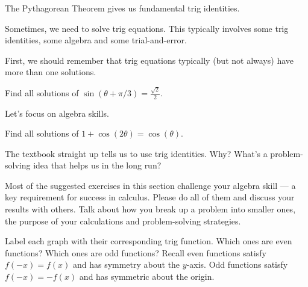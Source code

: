 \documentclass[../main.tex]{subfiles}
\begin{document}
The Pythagorean Theorem gives us fundamental trig identities.


Sometimes, we need to solve trig equations. This typically involves some trig identities, some algebra and some trial-and-error. 

First, we should remember that trig equations typically (but not always) have more than one solutions. 
\begin{example}
  Find all solutions of \(\sin(\theta + \pi/3) = \frac{\sqrt{2}}{2}\).

\end{example}
\clearpage

Let's focus on algebra skills.
\begin{example}
  Find all solutions of \(1 + \cos(2 \theta) = \cos(\theta)\).

  {\scriptsize The textbook straight up tells us to use trig identities. Why? What's a  problem-solving idea that helps us in the long run?}

\end{example}

\faExclamationTriangle{} Most of the suggested exercises in this section challenge your algebra skill --- a key requirement for success in calculus. Please do all of them and discuss your results with others. Talk about how you break up a problem into smaller ones, the purpose of your calculations and problem-solving strategies. 
\clearpage


\begin{example}
  Label each graph with their corresponding trig function. Which ones are even functions? Which ones are odd functions?  \newline
  {\footnotesize Recall even functions satisfy \(f(-x) = f(x)\) and has symmetry about the \(y\)-axis. Odd functions satisfy \(f(-x) = -f(x)\) and has symmetric about the origin.}

  \begin{center}
    
    \qquad
    
  \end{center}

  \begin{center}
    
    \qquad
    
  \end{center}

  \begin{center}
    
    \qquad
    
  \end{center}
\end{example}
\end{document}
